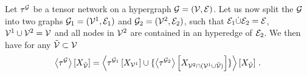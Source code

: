 \begin{theorem}\label{the:splittingContractions}
	Let $\tau^{\mathcal{G}}$ be a tensor network on a hypergraph $\mathcal{G}=(\mathcal{V},\mathcal{E})$.
	Let us now split the $\mathcal{G}$ into two graphs $\mathcal{G}_1=(\mathcal{V}^{1},\mathcal{E}_1)$ and $\mathcal{G}_2=(\mathcal{V}^{2},\mathcal{E}_2)$, such that $\mathcal{E}_1\dot{\cup}\mathcal{E}_2=\mathcal{E}$, $\mathcal{V}^{1}\cup\mathcal{V}^{2}=\mathcal{V}$ and all nodes in $\mathcal{V}^{2}$ are contained in an hyperedge of $\mathcal{E}_2$.
	We then have for any $\tilde{\mathcal{V}}\subset\mathcal{V}$
	\begin{align*}
		\left\langle \tau^{\mathcal{G}}\right\rangle \left[ X_{\tilde{\mathcal{V}}} \right]
		= \left\langle 
			\tau^{\mathcal{G}_1}\left[X_{\mathcal{V}^{1}}\right]
			\cup \{\left\langle \tau^{\mathcal{G}_2}\right\rangle \left[ X_{\mathcal{V}^{2}\cap(\mathcal{V}^{1}\cup\tilde{\mathcal{V}})} \right]\}
		\right\rangle \left[ X_{\tilde{\mathcal{V}}} \right]   \, .
\end{align*}
\end{theorem}
